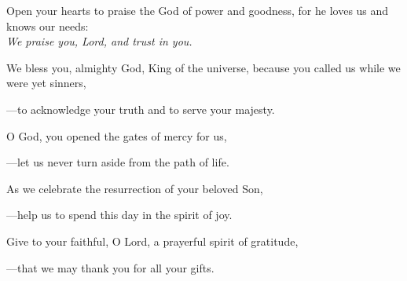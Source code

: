\intercessions\indent

\begin{hangpar}

Open your hearts to praise the God of power and goodness, for he loves us and knows our needs:\\
\emph{We praise you, Lord, and trust in you.}

\medskip We bless you, almighty God, King of the universe, because you called us while we were yet sinners,

{\color{red}---\thinspace}to acknowledge your truth and to serve your majesty.

\medskip O God, you opened the gates of mercy for us,

{\color{red}---\thinspace}let us never turn aside from the path of life.

\medskip As we celebrate the resurrection of your beloved Son,

{\color{red}---\thinspace}help us to spend this day in the spirit of joy.

\medskip Give to your faithful, O Lord, a prayerful spirit of gratitude,

{\color{red}---\thinspace}that we may thank you for all your gifts.

\end{hangpar}

